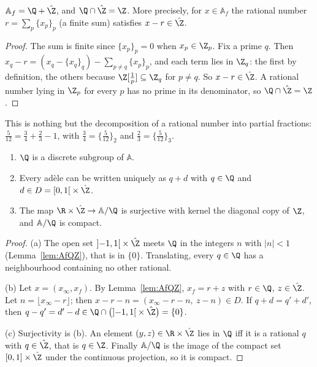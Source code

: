 \begin{lemma}\label{lem:AfQZ}
$\mathbb{A}_f=\Q+\hat{\Z}$, and $\Q\cap\hat{\Z}=\Z$. More precisely, for $x\in\mathbb{A}_f$ the rational number $r=\sum_p\{x_p\}_p$ (a finite sum)
satisfies $x-r\in\hat{\Z}$.
\end{lemma}
\begin{proof}
The sum is finite since $\{x_p\}_p=0$ when $x_p\in\Z_p$. Fix a prime $q$. Then $x_q-r=(x_q-\{x_q\}_q)-\sum_{p\ne q}\{x_p\}_p$, and
each term lies in $\Z_q$: the first by definition, the others because $\Z[\frac1p]\subseteq\Z_q$ for $p\ne q$. So $x-r\in\hat{\Z}$. A
rational number lying in $\Z_p$ for every $p$ has no prime in its denominator, so $\Q\cap\hat{\Z}=\Z$.
\end{proof}

This is nothing but the decomposition of a rational number into partial fractions: $\frac{5}{12}=\frac34+\frac23-1$, with
$\frac34=\{\frac5{12}\}_2$ and $\frac23=\{\frac5{12}\}_3$.

\begin{theorem}\label{thm:Qdiscrete}
\begin{enumerate}[label=(\alph*)]
\item $\Q$ is a discrete subgroup of $\mathbb{A}$.
\item Every ad\`ele can be written uniquely as $q+d$ with $q\in\Q$ and $d\in D=\left[0,1\right[\times\hat{\Z}$.
\item The map $\R\times\hat{\Z}\to\mathbb{A}/\Q$ is surjective with kernel the diagonal copy of $\Z$, and $\mathbb{A}/\Q$ is compact.
\end{enumerate}
\end{theorem}
\begin{proof}
(a) The open set $\left]-1,1\right[\times\hat{\Z}$ meets $\Q$ in the integers $n$ with $|n|<1$ (Lemma~\ref{lem:AfQZ}), that is in $\{0\}$.
Translating, every $q\in\Q$ has a neighbourhood containing no other rational.

(b) Let $x=(x_\infty,x_f)$. By Lemma~\ref{lem:AfQZ}, $x_f=r+z$ with $r\in\Q$, $z\in\hat{\Z}$. Let $n=\lfloor x_\infty-r\rfloor$; then
$x-r-n=(x_\infty-r-n,\ z-n)\in D$. If $q+d=q'+d'$, then $q-q'=d'-d\in\Q\cap\bigl(\left]-1,1\right[\times\hat{\Z}\bigr)=\{0\}$.

(c) Surjectivity is (b). An element $(y,z)\in\R\times\hat{\Z}$ lies in $\Q$ iff it is a rational $q$ with $q\in\hat{\Z}$, that is $q\in\Z$.
Finally $\mathbb{A}/\Q$ is the image of the compact set $[0,1]\times\hat{\Z}$ under the continuous projection, so it is compact.
\end{proof}

